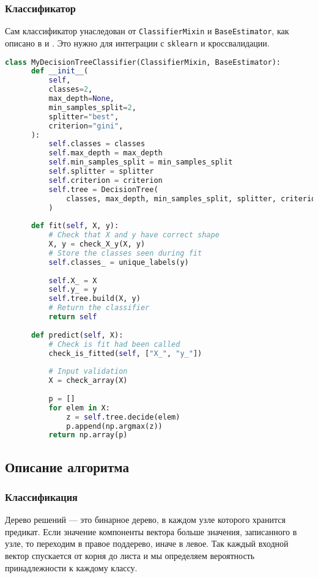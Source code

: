 \subsubsection{Классификатор}
Сам классификатор унаследован от \texttt{ClassifierMixin} и \texttt{BaseEstimator}, как описано в \cite{estimators} и \cite{skgit}. Это нужно для интеграции с \texttt{sklearn} и кроссвалидации.
\begin{lstlisting}[language=python, keepspaces=true]
class MyDecisionTreeClassifier(ClassifierMixin, BaseEstimator):
      def __init__(
          self,
          classes=2,
          max_depth=None,
          min_samples_split=2,
          splitter="best",
          criterion="gini",
      ):
          self.classes = classes
          self.max_depth = max_depth
          self.min_samples_split = min_samples_split
          self.splitter = splitter
          self.criterion = criterion
          self.tree = DecisionTree(
              classes, max_depth, min_samples_split, splitter, criterion
          )
  
      def fit(self, X, y):
          # Check that X and y have correct shape
          X, y = check_X_y(X, y)
          # Store the classes seen during fit
          self.classes_ = unique_labels(y)
  
          self.X_ = X
          self.y_ = y
          self.tree.build(X, y)
          # Return the classifier
          return self
  
      def predict(self, X):
          # Check is fit had been called
          check_is_fitted(self, ["X_", "y_"])
  
          # Input validation
          X = check_array(X)
  
          p = []
          for elem in X:
              z = self.tree.decide(elem)
              p.append(np.argmax(z))
          return np.array(p)
\end{lstlisting}
\pagebreak
\subsection{Описание алгоритма}
\subsubsection{Классификация}
Дерево решений --- это бинарное дерево, в каждом узле которого хранится предикат. Если значение компоненты вектора больше значения, записанного в узле, то переходим в правое поддерево, иначе в левое. Так каждый входной вектор спускается от корня до листа и мы определяем вероятность принадлежности к каждому классу.
